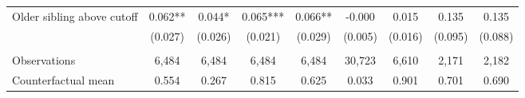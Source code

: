 {{\begin{tabular}{lcccccccc}
Older sibling above cutoff&       0.062** &       0.044*  &       0.065***&       0.066** &      -0.000   &       0.015   &       0.135   &       0.135   \\
                    &     (0.027)   &     (0.026)   &     (0.021)   &     (0.029)   &     (0.005)   &     (0.016)   &     (0.095)   &     (0.088)   \\
                    &               &               &               &               &               &               &               &               \\
Observations        &       6,484   &       6,484   &       6,484   &       6,484   &      30,723   &       6,610   &       2,171   &       2,182   \\
Counterfactual mean &       0.554   &       0.267   &       0.815   &       0.625   &       0.033   &       0.901   &       0.701   &       0.690   \\
 

\bottomrule
\end{tabular}
}
}
